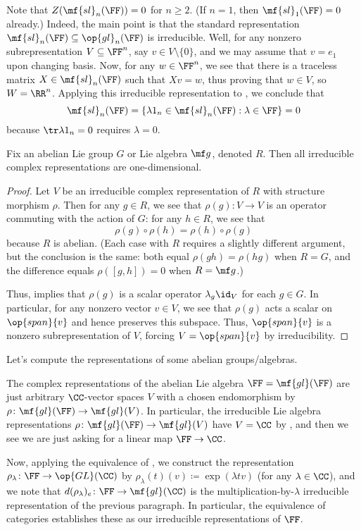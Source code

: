 \documentclass[../notes.tex]{subfiles}
\begin{document}
\begin{example}
	Note that $Z(\mf{sl}_n(\FF))=0$ for $n\ge2$. (If $n=1$, then $\mf{sl}_1(\FF)=0$ already.) Indeed, the main point is that the standard representation $\mf{sl}_n(\FF)\subseteq\op{gl}_n(\FF)$ is irreducible. Well, for any nonzero subrepresentation $V\subseteq\FF^n$, say $v\in V\setminus\{0\}$, and we may assume that $v=e_1$ upon changing basis. Now, for any $w\in\FF^n$, we see that there is a traceless matrix $X\in\mf{sl}_n(\FF)$ such that $Xv=w$, thus proving that $w\in V$, so $W=\RR^n$. Applying this irreducible representation to , we conclude that
	\[\mf{sl}_n(\FF)=\{\lambda1_n\in\mf{sl}_n(\FF):\lambda\in\FF\}=0\]
	because $\tr\lambda1_n=0$ requires $\lambda=0$.
\end{example}
\begin{corollary} \label{cor:abelian-irreps}
	Fix an abelian Lie group $G$ or Lie algebra $\mf g$, denoted $R$. Then all irreducible complex representations are one-dimensional.
\end{corollary}
\begin{proof}
	Let $V$ be an irreducible complex representation of $R$ with structure morphism $\rho$. Then for any $g\in R$, we see that $\rho(g)\colon V\to V$ is an operator commuting with the action of $G$: for any $h\in R$, we see that
	\[\rho(g)\circ\rho(h)=\rho(h)\circ\rho(g)\]
	because $R$ is abelian. (Each case with $R$ requires a slightly different argument, but the conclusion is the same: both equal $\rho(gh)=\rho(hg)$ when $R=G$, and the difference equals $\rho([g,h])=0$ when $R=\mf g$.)
	
	Thus,  implies that $\rho(g)$ is a scalar operator $\lambda_g\id_V$ for each $g\in G$. In particular, for any nonzero vector $v\in V$, we see that $\rho(g)$ acts a scalar on $\op{span}\{v\}$ and hence preserves this subspace. Thus, $\op{span}\{v\}$ is a nonzero subrepresentation of $V$, forcing $V=\op{span}\{v\}$ by irreducibility.
\end{proof}
Let's compute the representations of some abelian groups/algebras.
\begin{example} \label{ex:irreps-ga}
	The complex representations of the abelian Lie algebra $\FF=\mf{gl}(\FF)$ are just arbitrary $\CC$-vector spaces $V$ with a chosen endomorphism by $\rho\colon\mf{gl}(\FF)\to\mf{gl}(V)$. In particular, the irreducible Lie algebra representations $\rho\colon\mf{gl}(\FF)\to\mf{gl}(V)$ have $V=\CC$ by , and then we see we are just asking for a linear map $\FF\to\CC$.
	
	Now, applying the equivalence of , we construct the representation $\rho_\lambda\colon\FF\to\op{GL}(\CC)$ by $\rho_\lambda(t)(v)\coloneqq\exp(\lambda tv)$ (for any $\lambda\in\CC$), and we note that $d(\rho_\lambda)_e\colon\FF\to\mf{gl}(\CC)$ is the multiplication-by-$\lambda$ irreducible representation of the previous paragraph. In particular, the equivalence of categories establishes these as our irreducible representations of $\FF$.
\end{example}
\end{document}
